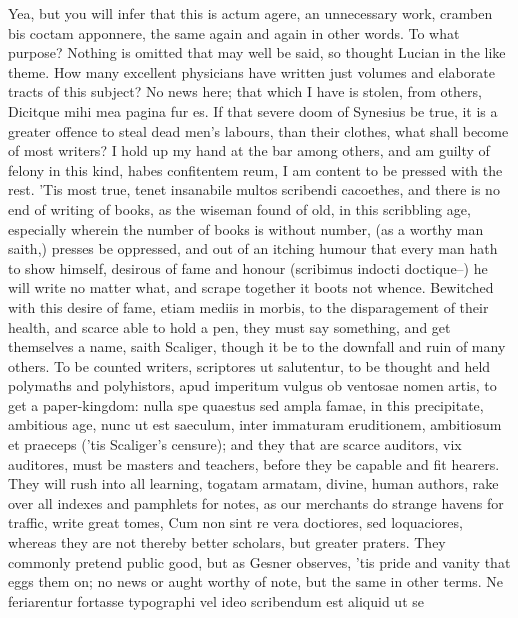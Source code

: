 {Yea, but you will infer that this is actum agere, an unnecessary
work, cramben bis coctam apponnere, the same again and again in other
words. To what purpose? Nothing is omitted that may well be said,
so thought Lucian in the like theme. How many excellent physicians have
written just volumes and elaborate tracts of this subject? No news
here; that which I have is stolen, from others, Dicitque mihi mea
pagina fur es. If that severe doom of Synesius be true, it is a
greater offence to steal dead men's labours, than their clothes, what
shall become of most writers? I hold up my hand at the bar among
others, and am guilty of felony in this kind, habes confitentem reum, I
am content to be pressed with the rest. 'Tis most true, tenet
insanabile multos scribendi cacoethes, and there is no end of
writing of books, as the wiseman found of old, in this scribbling
age, especially wherein the number of books is without number, (as
a worthy man saith,) presses be oppressed, and out of an itching humour
that every man hath to show himself, desirous of fame and honour
(scribimus indocti doctique--) he will write no matter what, and scrape
together it boots not whence. Bewitched with this desire of fame,
etiam mediis in morbis, to the disparagement of their health, and
scarce able to hold a pen, they must say something, and get
themselves a name, saith Scaliger, though it be to the downfall and
ruin of many others. To be counted writers, scriptores ut salutentur,
to be thought and held polymaths and polyhistors, apud imperitum vulgus
ob ventosae nomen artis, to get a paper-kingdom: nulla spe quaestus sed
ampla famae, in this precipitate, ambitious age, nunc ut est saeculum,
inter immaturam eruditionem, ambitiosum et praeceps ('tis
Scaliger's censure); and they that are scarce auditors, vix
auditores, must be masters and teachers, before they be capable and fit
hearers. They will rush into all learning, togatam armatam, divine,
human authors, rake over all indexes and pamphlets for notes, as our
merchants do strange havens for traffic, write great tomes, Cum non
sint re vera doctiores, sed loquaciores, whereas they are not thereby
better scholars, but greater praters. They commonly pretend public
good, but as Gesner observes, 'tis pride and vanity that eggs them
on; no news or aught worthy of note, but the same in other terms. Ne
feriarentur fortasse typographi vel ideo scribendum est aliquid ut se
}
